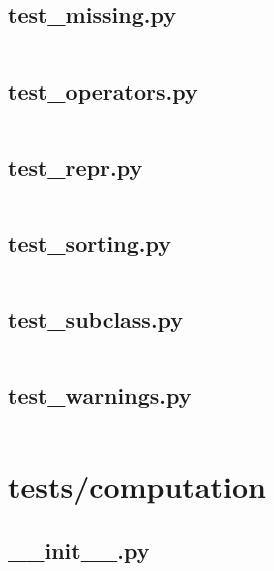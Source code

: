 \documentclass{article}
\begin{document}
\subsection{test\_missing.py}
\inputminted{python}{/home/dufferzafar/dev/@clones/pandas/pandas/tests/categorical/test_missing.py}
\newpage

\subsection{test\_operators.py}
\inputminted{python}{/home/dufferzafar/dev/@clones/pandas/pandas/tests/categorical/test_operators.py}
\newpage

\subsection{test\_repr.py}
\inputminted{python}{/home/dufferzafar/dev/@clones/pandas/pandas/tests/categorical/test_repr.py}
\newpage

\subsection{test\_sorting.py}
\inputminted{python}{/home/dufferzafar/dev/@clones/pandas/pandas/tests/categorical/test_sorting.py}
\newpage

\subsection{test\_subclass.py}
\inputminted{python}{/home/dufferzafar/dev/@clones/pandas/pandas/tests/categorical/test_subclass.py}
\newpage

\subsection{test\_warnings.py}
\inputminted{python}{/home/dufferzafar/dev/@clones/pandas/pandas/tests/categorical/test_warnings.py}
\newpage

\section{tests/computation}

\subsection{\_\_init\_\_.py}
\inputminted{python}{/home/dufferzafar/dev/@clones/pandas/pandas/tests/computation/__init__.py}
\newpage
\end{document}
